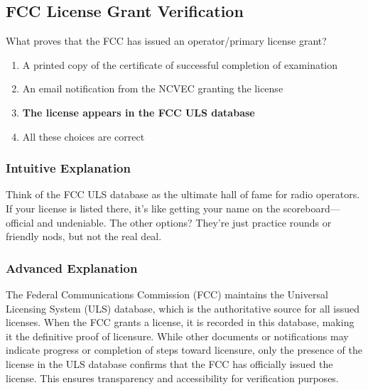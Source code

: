 \subsection{FCC License Grant Verification}
\label{T1A05}

\begin{tcolorbox}[colback=gray!10!white,colframe=black!75!black,title=T1A05]
What proves that the FCC has issued an operator/primary license grant?
\begin{enumerate}[label=\Alph*),noitemsep]
    \item A printed copy of the certificate of successful completion of examination
    \item An email notification from the NCVEC granting the license
    \item \textbf{The license appears in the FCC ULS database}
    \item All these choices are correct
\end{enumerate}
\end{tcolorbox}

\subsubsection*{Intuitive Explanation}
Think of the FCC ULS database as the ultimate hall of fame for radio operators. If your license is listed there, it's like getting your name on the scoreboard—official and undeniable. The other options? They're just practice rounds or friendly nods, but not the real deal.

\subsubsection*{Advanced Explanation}
The Federal Communications Commission (FCC) maintains the Universal Licensing System (ULS) database, which is the authoritative source for all issued licenses. When the FCC grants a license, it is recorded in this database, making it the definitive proof of licensure. While other documents or notifications may indicate progress or completion of steps toward licensure, only the presence of the license in the ULS database confirms that the FCC has officially issued the license. This ensures transparency and accessibility for verification purposes.